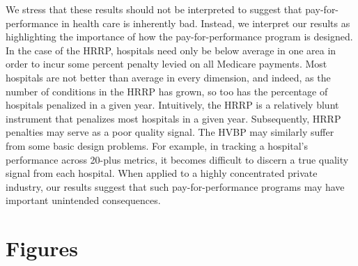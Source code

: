 \documentclass[12pt]{article}
\begin{document}
We stress that these results should not be interpreted to suggest that pay-for-performance in health care is inherently bad. Instead, we interpret our results as highlighting the importance of how the pay-for-performance program is designed. In the case of the HRRP, hospitals need only be below average in one area in order to incur some percent penalty levied on all Medicare payments. Most hospitals are not better than average in every dimension, and indeed, as the number of conditions in the HRRP has grown, so too has the percentage of hospitals penalized in a given year. Intuitively, the HRRP is a relatively blunt instrument that penalizes most hospitals in a given year. Subsequently, HRRP penalties may serve as a poor quality signal. The HVBP may similarly suffer from some basic design problems. For example, in tracking a hospital's performance across 20-plus metrics, it becomes difficult to discern a true quality signal from each hospital. When applied to a highly concentrated private industry, our results suggest that such pay-for-performance programs may have important unintended consequences.

\newpage




\clearpage
\newpage


\newsavebox{\gfxbox}
\newpage
\section*{Figures}
\end{document}
